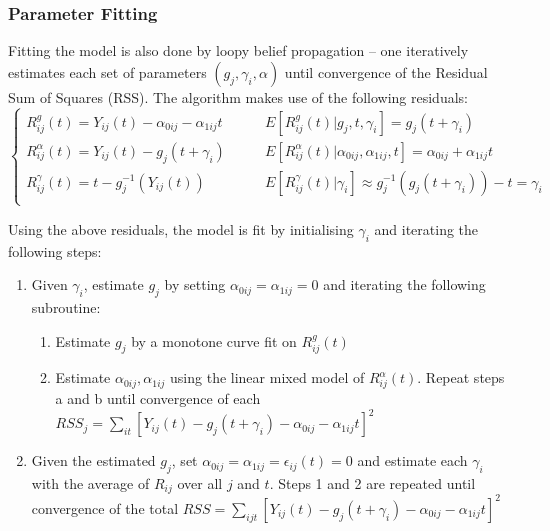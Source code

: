 \subsubsection{Parameter Fitting}

Fitting the model is also done by loopy belief propagation -- one iteratively estimates each set of parameters $(g_j, \gamma_i, \alpha)$ until convergence of the Residual Sum of Squares (RSS). The algorithm makes use of the following residuals:
\begin{equation}
\begin{cases}
  R_{ij}^g(t) = Y_{ij}(t) - \alpha_{0ij} - \alpha_{1ij}t & \qquad E\left[ R_{ij}^g(t) | g_j, t, \gamma_i \right] = g_j(t+\gamma_i)\\
  R_{ij}^{\alpha}(t) = Y_{ij}(t) - g_j(t+\gamma_i) & \qquad E\left[ R_{ij}^{\alpha}(t) | \alpha_{0ij}, \alpha_{1ij}, t \right] = \alpha_{0ij} + \alpha_{1ij}t\\
  R_{ij}^{\gamma}(t) = t-g_j^{-1}(Y_{ij}(t)) & \qquad E\left[ R_{ij}^{\gamma}(t) | \gamma_i \right] \approx g_j^{-1}(g_j(t+\gamma_i))-t = \gamma_i\\  
\end{cases}  
\end{equation}

Using the above residuals, the model is fit by initialising $\gamma_i$ and iterating the following steps\cite{donohue2014estimating}:
\begin{enumerate}
 \item Given $\gamma_i$, estimate $g_j$ by setting $\alpha_{0ij} = \alpha_{1ij} = 0$ and iterating the following subroutine:
 \begin{enumerate}
  \item Estimate $g_j$ by a monotone curve fit on $R_{ij}^g(t)$
  \item Estimate $\alpha_{0ij}, \alpha_{1ij}$ using the linear mixed model of $R_{ij}^{\alpha}(t)$. Repeat steps a and b until convergence of each $RSS_j = \sum_{it} \left[ Y_{ij}(t)-g_j(t+\gamma_i)-\alpha_{0ij}-\alpha_{1ij}t \right]^2 $
 \end{enumerate}
 
 \item Given the estimated $g_j$, set $\alpha_{0ij} = \alpha_{1ij} = \epsilon_{ij}(t) = 0$ and estimate each $\gamma_i$ with the average of $R_{ij}$ over all $j$ and $t$. Steps 1 and 2 are repeated until convergence of the total $RSS = \sum_{ijt} \left[ Y_{ij}(t)-g_j(t+\gamma_i)-\alpha_{0ij}-\alpha_{1ij}t \right]^2 $

\end{enumerate}

